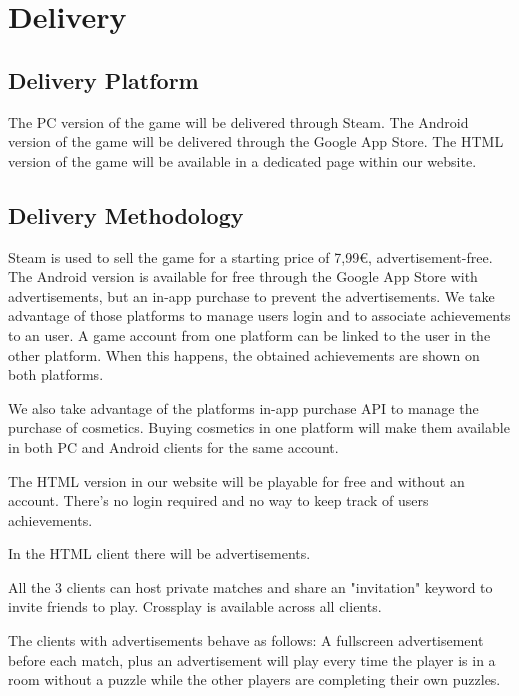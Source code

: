\section{Delivery}

\subsection{Delivery Platform}
The PC      version of the game will be delivered through Steam. 
The Android version of the game will be delivered through the Google App Store.
The HTML    version of the game will be available in a dedicated page within our website.

\subsection{Delivery Methodology}
Steam is used to sell the game for a starting price of 7,99€, advertisement-free.
The Android version is available for free through the Google App Store with advertisements, but an in-app purchase to prevent the advertisements.
We take advantage of those platforms to manage users login and to associate achievements to an user. A game account from one platform can be linked to the user in the other platform. When this happens, the obtained achievements are shown on both platforms. 


We also take advantage of the platforms in-app purchase API to manage the purchase of cosmetics. Buying cosmetics in one platform will make them available in both PC and Android clients for the same account.

The HTML version in our website will be playable for free and without an account. 
There's no login required and no way to keep track of users achievements.

In the HTML client there will be advertisements.

All the 3 clients can host private matches and share an "invitation" keyword to invite friends to play. Crossplay is available across all clients.

The clients with advertisements behave as follows:
A fullscreen advertisement before each match, plus an advertisement will play every time the player is in a room without a puzzle while the other players are completing their own puzzles.

\pagebreak 